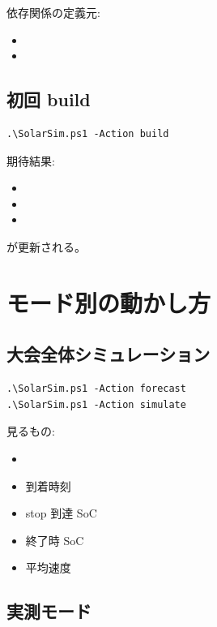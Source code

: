 \documentclass[a4paper,11pt]{article}
\begin{document}
依存関係の定義元:

\begin{itemize}
  \item {}
  \item {}
\end{itemize}

\subsection{初回 build}

\begin{Verbatim}[fontsize=\small]
.\SolarSim.ps1 -Action build
\end{Verbatim}

期待結果:

\begin{itemize}
  \item {}
  \item {}
  \item {}
\end{itemize}

が更新される。

\section{モード別の動かし方}

\subsection{大会全体シミュレーション}

\begin{Verbatim}[fontsize=\small]
.\SolarSim.ps1 -Action forecast
.\SolarSim.ps1 -Action simulate
\end{Verbatim}

見るもの:

\begin{itemize}
  \item {}
  \item 到着時刻
  \item stop 到達 SoC
  \item 終了時 SoC
  \item 平均速度
\end{itemize}

\subsection{実測モード}
\end{document}
